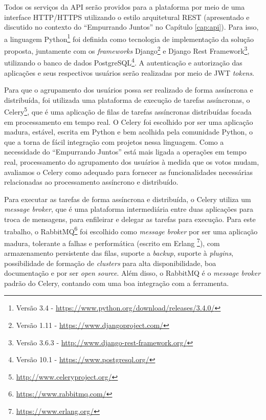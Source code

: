     Todos os serviços da API serão providos para a plataforma por meio de uma interface HTTP/HTTPS utilizando o estilo arquitetural REST 
    (apresentado e discutido no contexto do ``Empurrando Juntos'' no Capítulo \ref{cap:api}).
    Para isso, a linguagem Python\footnote{Versão 3.4 - \href{https://www.python.org/download/releases/3.4.0/}{https://www.python.org/download/releases/3.4.0/}} 
    foi definida como tecnologia de implementação da solução proposta, juntamente com os \textit{frameworks}
    Django\footnote{Versão 1.11 - \href{https://www.djangoproject.com/}{https://www.djangoproject.com/}} e 
    Django Rest Framework\footnote{Versão 3.6.3 - \href{http://www.django-rest-framework.org/}{http://www.django-rest-framework.org/}}, 
    utilizando o banco de dados PostgreSQL\footnote{Versão 10.1 - \href{https://www.postgresql.org/}{https://www.postgresql.org/}}.
    A autenticação e autorização das aplicações e seus respectivos usuários serão realizadas por meio de JWT \textit{tokens}.
     
    Para que o agrupamento dos usuários possa ser realizado de forma assíncrona e distribuída, 
    foi utilizada uma plataforma de execução de tarefas assíncronas,
    o Celery\footnote{\href{http://www.celeryproject.org/}{http://www.celeryproject.org/}},
    que é uma aplicação de filas de tarefas assíncronas distribuídas focada em processamento em tempo real.
    O Celery foi escolhido por ser uma aplicação madura, estável, escrita em Python e bem acolhida pela comunidade Python,
    o que a torna de fácil integração com projetos nessa linguagem.
    Como a necessidade do ``Empurrando Juntos'' está mais ligada a operações em tempo real,
    processamento do agrupamento dos usuários à medida que os votos mudam,
    avaliamos o Celery como adequado para fornecer as funcionalidades necessárias relacionadas ao processamento assíncrono e distribuído.
    
    Para executar as tarefas de forma assíncrona e distribuída, o Celery utiliza um \textit{message broker},
    que é uma plataforma intermediária entre duas aplicações para troca de mensagens,
    para enfileirar e delegar as tarefas para execução. 
    Para este trabalho, o RabbitMQ\footnote{\href{https://www.rabbitmq.com/}{https://www.rabbitmq.com/}}
    foi escolhido como \textit{message broker} por ser uma aplicação madura, tolerante a falhas e performática
    (escrito em Erlang \footnote{\href{https://www.erlang.org/}{https://www.erlang.org/}}),
    com armazenamento persistente das filas, suporte a \textit{backup}, suporte à \textit{plugins},
    possibilidade de formação de \textit{clusters} para alta disponibilidade,
    boa documentação e por ser \textit{open source}.
    Além disso, o RabbitMQ é o \textit{message broker} padrão do Celery, contando com uma boa integração com a ferramenta.
    
